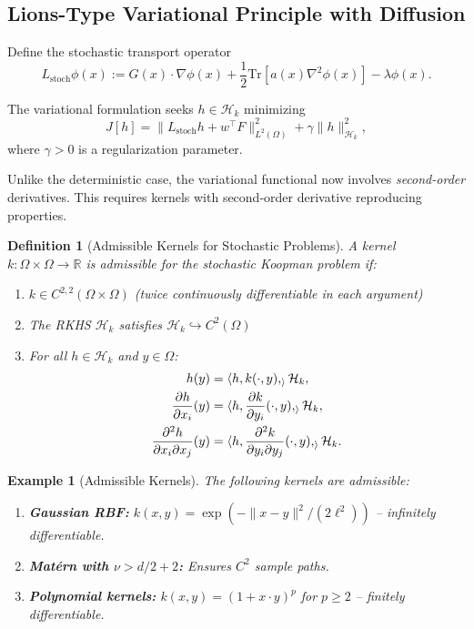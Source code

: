 \documentclass[11pt,a4paper]{article}
\newtheorem{definition}[theorem]{Definition}
\newtheorem{example}[theorem]{Example}
\newcommand{\R}{\mathbb{R}}
\newcommand{\Tr}{\mathrm{Tr}}
\newcommand{\RKHS}{\mathcal{H}_k}
\newcommand{\inner}[2]{\langle #1, #2 \rangle}
\newcommand{\norm}[1]{\| #1 \|}
\begin{document}
\subsection{Lions-Type Variational Principle with Diffusion}

Define the stochastic transport operator
\begin{equation}
L_{\mathrm{stoch}} \phi(x) := G(x) \cdot \nabla \phi(x) + \frac{1}{2}\Tr[a(x) \nabla^2 \phi(x)] - \lambda \phi(x).
\end{equation}

The variational formulation seeks $h \in \RKHS$ minimizing
\begin{equation}\label{eq:variational_stoch}
J[h] = \norm{L_{\mathrm{stoch}} h + w^\top F}_{L^2(\Omega)}^2 + \gamma \norm{h}_{\RKHS}^2,
\end{equation}
where $\gamma > 0$ is a regularization parameter.

Unlike the deterministic case, the variational functional now involves \emph{second-order} derivatives. This requires kernels with second-order derivative reproducing properties.

\begin{definition}[Admissible Kernels for Stochastic Problems]
A kernel $k: \Omega \times \Omega \to \R$ is \emph{admissible} for the stochastic Koopman problem if:
\begin{enumerate}[label=(\roman*)]
\item $k \in C^{2,2}(\Omega \times \Omega)$ (twice continuously differentiable in each argument)
\item The RKHS $\RKHS$ satisfies $\RKHS \hookrightarrow C^2(\Omega)$
\item For all $h \in \RKHS$ and $y \in \Omega$:
\begin{align}
h(y) &= \inner{h, k(\cdot, y)}_{\RKHS}, \\
\frac{\partial h}{\partial x_i}(y) &= \inner{h, \frac{\partial k}{\partial y_i}(\cdot, y)}_{\RKHS}, \\
\frac{\partial^2 h}{\partial x_i \partial x_j}(y) &= \inner{h, \frac{\partial^2 k}{\partial y_i \partial y_j}(\cdot, y)}_{\RKHS}.
\end{align}
\end{enumerate}
\end{definition}

\begin{example}[Admissible Kernels]
The following kernels are admissible:
\begin{enumerate}
\item \textbf{Gaussian RBF:} $k(x,y) = \exp(-\|x-y\|^2/(2\ell^2))$ -- infinitely differentiable.
\item \textbf{Mat\'{e}rn with $\nu > d/2 + 2$:} Ensures $C^2$ sample paths.
\item \textbf{Polynomial kernels:} $k(x,y) = (1 + x \cdot y)^p$ for $p \geq 2$ -- finitely differentiable.
\end{enumerate}
\end{example}
\end{document}
